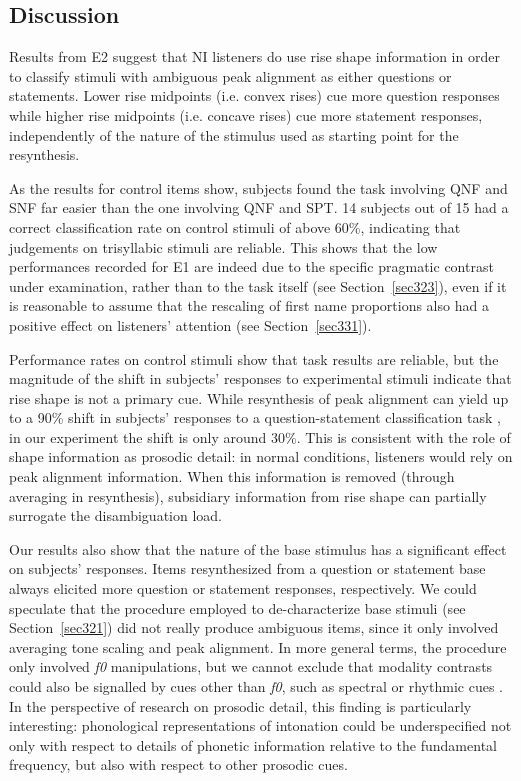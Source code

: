 \subsection{Discussion}\label{sec333}
Results from E2 suggest that NI listeners do use rise shape information in order to classify stimuli with ambiguous peak alignment as either questions or statements. Lower rise midpoints (i.e. convex rises) cue more question responses while higher rise midpoints (i.e. concave rises) cue more statement responses, independently of the nature of the stimulus used as starting point for the resynthesis.

As the results for control items show, subjects found the task involving QNF and SNF far easier than the one involving QNF and SPT. 14 subjects out of 15 had a correct classification rate on control stimuli of above 60\%, indicating that judgements on trisyllabic stimuli are reliable. This shows that the low performances recorded for E1 are indeed due to the specific pragmatic contrast under examination, rather than to the task itself (see Section~\ref{sec323}), even if it is reasonable to assume that the rescaling of first name proportions also had a positive effect on listeners' attention (see Section~\ref{sec331}).

Performance rates on control stimuli show that task results are reliable, but the magnitude of the shift in subjects' responses to experimental stimuli indicate that rise shape is not a primary cue. While resynthesis of peak alignment can yield up to a 90\% shift in subjects' responses to a question-statement classification task \citep[§3, among others]{dimperio2000role}, in our experiment the shift is only around 30\%. This is consistent with the role of shape information as prosodic detail: in normal conditions, listeners would rely on peak alignment information. When this information is removed (through averaging in resynthesis), subsidiary information from rise shape can partially surrogate the disambiguation load.

Our results also show that the nature of the base stimulus has a significant effect on subjects' responses. Items resynthesized from a question or statement base always elicited more question or statement responses, respectively. We could speculate that the procedure employed to de-characterize base stimuli (see Section~\ref{sec321}) did not really produce ambiguous items, since it only involved averaging tone scaling and peak alignment. In more general terms, the procedure only involved \textit{f0} manipulations, but we cannot exclude that modality contrasts could also be signalled by cues other than \textit{f0}, such as spectral or rhythmic cues \citep[§5, among others]{niebuhr2010pitchaccent,dimperio2000role}. In the perspective of research on prosodic detail, this finding is particularly interesting: phonological representations of intonation could be underspecified not only with respect to details of phonetic information relative to the fundamental frequency, but also with respect to other prosodic cues.


